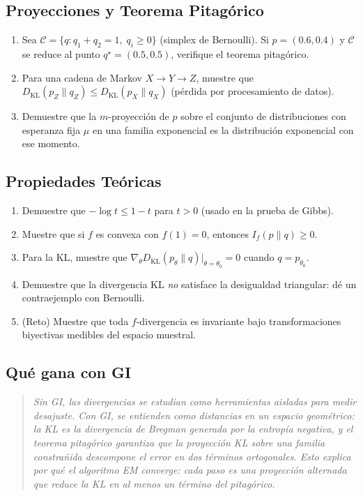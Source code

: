 \subsection*{Proyecciones y Teorema Pitagórico}
\begin{enumerate}[resume]
	\item[$\star\star$] Sea $\mathcal{C} = \{q : q_1 + q_2 = 1,\; q_i \ge 0\}$ (simplex de Bernoulli).  Si $p = (0.6, 0.4)$ y $\mathcal{C}$ se reduce al punto $q^\star = (0.5, 0.5)$, verifique el teorema pitagórico.
	\item[$\star\star\star$] Para una cadena de Markov $X \to Y \to Z$, muestre que $D_{\mathrm{KL}}(p_Z \| q_Z) \le D_{\mathrm{KL}}(p_X \| q_X)$ (pérdida por procesamiento de datos).
	\item[$\star\star\star$] Demuestre que la $m$-proyección de $p$ sobre el conjunto de distribuciones con esperanza fija $\mu$ en una familia exponencial es la distribución exponencial con ese momento.
\end{enumerate}

\subsection*{Propiedades Teóricas}
\begin{enumerate}[resume]
	\item[$\star\star$] Demuestre que $-\log t \le 1 - t$ para $t > 0$ (usado en la prueba de Gibbs).
	\item[$\star\star\star$] Muestre que si $f$ es convexa con $f(1)=0$, entonces $I_f(p \| q) \ge 0$.
	\item[$\star\star\star$] Para la KL, muestre que $\nabla_\theta D_{\mathrm{KL}}(p_\theta \| q) \big|_{\theta=\theta_0} = 0$ cuando $q = p_{\theta_0}$.
	\item[$\star\star$] Demuestre que la divergencia KL \emph{no} satisface la desigualdad triangular: dé un contraejemplo con Bernoulli.
	\item[$\star\star\star\star$] (Reto) Muestre que toda $f$-divergencia es invariante bajo transformaciones biyectivas medibles del espacio muestral.
\end{enumerate}

\subsection*{Qué gana con GI}
\begin{quote}
	\itshape
	Sin GI, las divergencias se estudian como herramientas aisladas para medir desajuste.  Con GI, se entienden como \emph{distancias} en un espacio geométrico: la KL es la divergencia de Bregman generada por la entropía negativa, y el teorema pitagórico garantiza que la proyección KL sobre una familia constrañida descompone el error en dos términos ortogonales.  Esto explica por qué el algoritmo EM converge: cada paso es una proyección alternada que reduce la KL en al menos un término del pitagórico.
\end{quote}
